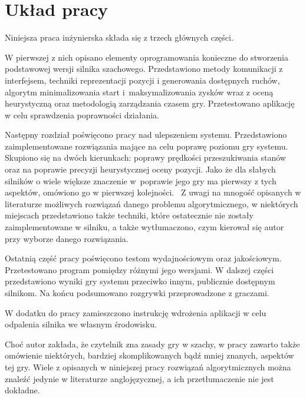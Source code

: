 \usepackage{biblatex}\section{Układ pracy}
\label{sec:uklad-pracy}

Niniejsza praca inżynierska składa się z trzech głównych części.

W pierwszej z nich opisano elementy oprogramowania konieczne do stworzenia podstawowej wersji silnika szachowego.
Przedstawiono metody komunikacji z interfejsem, techniki reprezentacji pozycji i generowania dostępnych ruchów, algorytm minimalizowania start i~maksymalizowania zysków wraz z oceną heurystyczną oraz metodologią zarządzania czasem gry.
Przetestowano aplikację w celu sprawdzenia poprawności działania.

Następny rozdział poświęcono pracy nad ulepszeniem systemu.
Przedstawiono zaimplementowane rozwiązania mające na celu poprawę poziomu gry systemu.
Skupiono się na dwóch kierunkach: poprawy prędkości przeszukiwania stanów oraz na poprawie precyzji heurystycznej oceny pozycji.
Jako że dla słabych silników o wiele większe znaczenie w~poprawie jego gry ma pierwszy z tych aspektów, omówiono go w pierwszej kolejności.~\cite*{Vrzina2023}
Z uwagi na mnogość opisanych w literaturze możliwych rozwiązań danego problemu algorytmicznego, w niektórych miejscach przedstawiono także techniki, które ostatecznie nie zostały zaimplementowane w silniku, a także wytłumaczono, czym kierował się autor przy wyborze danego rozwiązania.

Ostatnią część pracy poświęcono testom wydajnościowym oraz jakościowym.
Przetestowano program pomiędzy różnymi jego wersjami.
W dalszej części przedstawiono wyniki gry systemu przeciwko innym, publicznie dostępnym silnikom.
Na końcu podsumowano rozgrywki przeprowadzone z graczami.

W dodatku do pracy zamieszczono instrukcję wdrożenia aplikacji w celu odpalenia silnika we własnym środowisku.

Choć autor zakłada, że czytelnik zna zasady gry w szachy, w pracy zawarto także omówienie niektórych, bardziej skomplikowanych bądź mniej znanych, aspektów tej gry.
Wiele z opisanych w niniejszej pracy rozwiązań algorytmicznych można znaleźć jedynie w literaturze anglojęzycznej, a ich przetłumaczenie nie jest dokładne.